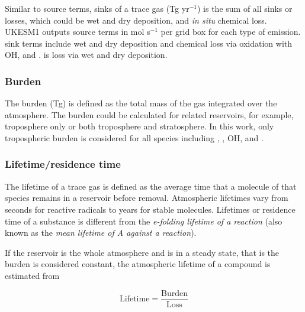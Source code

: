 Similar to source terms, sinks of a trace gas (Tg yr$^{-1}$) is the sum of all sinks or losses, which could be wet and dry deposition, and \textit{in situ} chemical loss. UKESM1 outputs source terms in mol s$^{-1}$ per grid box for each type of emission.  sink terms include wet and dry deposition and chemical loss via oxidation with OH,  and .  is loss via wet and dry deposition.

\subsubsection{Burden}

The burden (Tg) is defined as the total mass of the gas integrated over the atmosphere. The burden could be calculated for related reservoirs, for example, troposphere only or both troposphere and stratosphere. In this work, only tropospheric burden is considered for all species including , , OH,  and .

\subsubsection{Lifetime/residence time}

The lifetime of a trace gas is defined as the average time that a molecule of that species remains in a reservoir before removal. Atmospheric lifetimes vary from seconds for reactive radicals to years for stable molecules. Lifetimes or residence time of a substance is different from the \textit{e-folding lifetime of a reaction} (also known as the \textit{mean lifetime of A against a reaction}). 

If the reservoir is the whole atmosphere and is in a steady state, that is the burden is considered constant,  the atmospheric lifetime of a compound is estimated from 

\begin{equation}
\label{eq:lifetime}
 \text{Lifetime} = \frac{\text{Burden}}{\text{Loss}}    
\end{equation}
